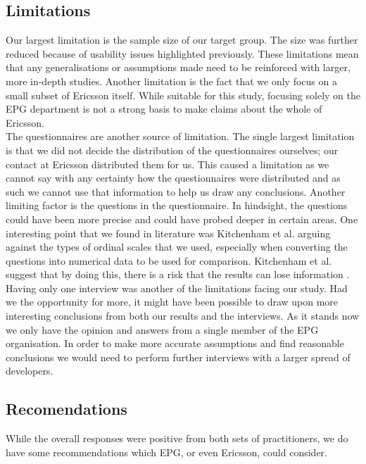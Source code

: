 \documentclass[final_report_innit.tex]{subfiles}
\begin{document}
\subsection{Limitations}

Our largest limitation is the sample size of our target group. The size was further reduced because of usability issues highlighted previously. These limitations mean that any generalisations or assumptions made need to be reinforced with larger, more in-depth studies. Another limitation is the fact that we only focus on a small subset of Ericsson itself. While suitable for this study, focusing solely on the EPG department is not a strong basis to make claims about the whole of Ericsson.
\\

The questionnaires are another source of limitation. The single largest limitation is that we did not decide the distribution of the questionnaires ourselves; our contact at Ericsson distributed them for us. This caused a limitation as we cannot say with any certainty how the questionnaires were distributed and as such we cannot use that information to help us draw any conclusions. Another limiting factor is the questions in the questionnaire. In hindsight, the questions could have been more precise and could have probed deeper in certain areas. One interesting point that we found in literature was Kitchenham et al. \cite{kitchenham2003principles} arguing against the types of ordinal scales that we used, especially when converting the questions into numerical data to be used for comparison. Kitchenham et al. suggest that by doing this, there is a risk that the results can lose information \cite{kitchenham2003principles}.
\\

Having only one interview was another of the limitations facing our study. Had we the opportunity for more, it might have been possible to draw upon more interesting conclusions from both our results and the interviews. As it stands now we only have the opinion and answers from a single member of the EPG organisation. In order to make more accurate assumptions and find reasonable conclusions we would need to perform further interviews with a larger spread of developers.

\subsection{Recomendations}

While the overall responses were positive from both sets of practitioners, we do have some recommendations which EPG, or even Ericsson, could consider. 
\\
\end{document}

